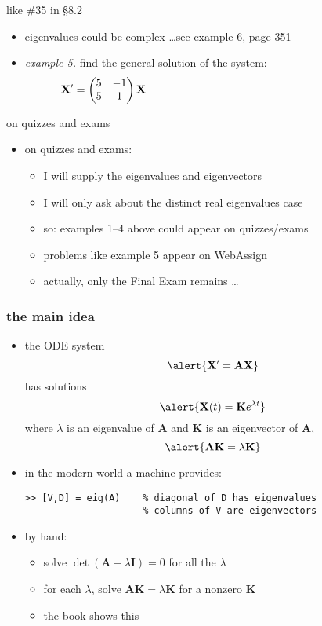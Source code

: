 \documentclass[urlcolor=blue,dvipsnames]{beamer}
\newcommand{\bA}{\mathbf{A}}
\newcommand{\bI}{\mathbf{I}}
\newcommand{\bK}{\mathbf{K}}
\newcommand{\bX}{\mathbf{X}}
\begin{document}
\begin{frame}{like \#35 in \S8.2}

\begin{itemize}
\item eigenvalues could be complex \dots see example 6, page 351
\item \emph{example 5.}  find the general solution of the system:
$$\bX' = \begin{pmatrix} 5 & -1 \\ 5 & 1 \end{pmatrix} \bX \hspace{70mm}$$
\end{itemize}

\vspace{70mm}
\end{frame}


\begin{frame}{on quizzes and exams}

\begin{itemize}
\item on quizzes and exams:
    \begin{itemize}
    \item \alert{I will supply the eigenvalues and eigenvectors}
    \item \alert{I will only ask about the distinct real eigenvalues case}
    \item so: examples 1--4 above could appear on quizzes/exams
    \item problems like example 5 appear on WebAssign
    \item actually, only the Final Exam remains \dots
    \end{itemize}
\end{itemize}
\end{frame}


\begin{frame}[fragile]
\frametitle{the main idea}

\begin{itemize}
\item the ODE system
    $$\alert{\bX' = \bA \bX}$$
has solutions
    $$\alert{\bX(t) = \bK e^{\lambda t}}$$
where $\lambda$ is an eigenvalue of $\bA$ and $\bK$ is an eigenvector of $\bA$,
    $$\alert{\bA\bK=\lambda \bK}$$

\medskip
\item in the modern world a machine provides:
\begin{Verbatim}[fontsize=\small]
>> [V,D] = eig(A)    % diagonal of D has eigenvalues
                     % columns of V are eigenvectors
\end{Verbatim}

\bigskip
\item by hand:
    \begin{itemize}
    \item solve \quad $\det(\bA - \lambda \bI) = 0$ \quad for all the $\lambda$
    \item for each $\lambda$, solve $\bA\bK=\lambda \bK$ for a nonzero $\bK$
    \item the book shows this
    \end{itemize}
\end{itemize}
\end{frame}
\end{document}
